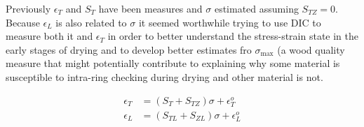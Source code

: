 Previously $\epsilon_T$ and $S_T$ have been measures and $\sigma$ estimated assuming $S_{TZ}=0$\citep{bookerXX}. Because $\epsilon_L$ is also related to $\sigma$ it seemed worthwhile trying to use DIC to measure both it and $\epsilon_T$ in order to better understand the stress-strain state in the early stages of drying and to develop better estimates fro $\sigma_\max$ (a wood quality measure that might potentially contribute to explaining why some material is susceptible to intra-ring checking during drying and other material is not.

\begin{eqnarray}
\epsilon_T &= \left(S_T + S_{TZ}\right)\sigma + \epsilon^o_T \\
\epsilon_L &= \left(S_{TL} + S_{ZL}\right)\sigma + \epsilon^o_L 
\end{eqnarray}